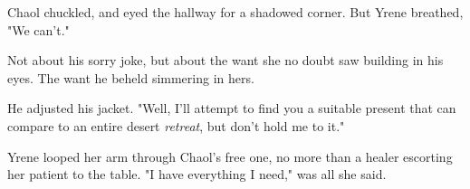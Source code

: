 Chaol chuckled, and eyed the hallway for a shadowed corner. But Yrene breathed, "We can't."

Not about his sorry joke, but about the want she no doubt saw building in his eyes. The want he beheld simmering in hers.

He adjusted his jacket. "Well, I'll attempt to find you a suitable present that can compare to an entire desert \emph{retreat}, but don't hold me to it."

Yrene looped her arm through Chaol's free one, no more than a healer escorting her patient to the table. "I have everything I need," was all she said.

